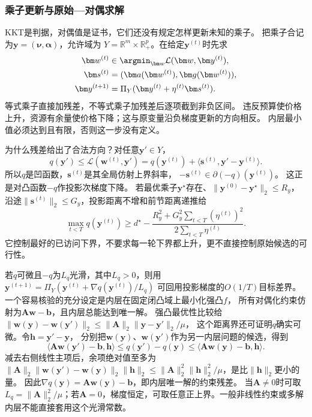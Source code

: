 \subsubsection{乘子更新与原始—对偶求解}
\label{sec:opt-multiplier-updates}

KKT是判据，对偶值是证书，它们还没有规定怎样更新未知的乘子。
把乘子合记为$\bm y=(\bm\nu,\bm\alpha)$，允许域为
$Y=\mathbb R^m\times\mathbb R_+^p$。在给定$\bm y^{(t)}$时先求
\[
 \begin{aligned}
 \bm w^{(t)}&\in\argmin_{\bm w}\mathcal L(\bm w,\bm y^{(t)}),\\
 \bm s^{(t)}&=(\bm a(\bm w^{(t)}),\bm g(\bm w^{(t)})),\\
 \bm y^{(t+1)}&=\Pi_Y(\bm y^{(t)}+\eta^{(t)}\bm s^{(t)}).
 \end{aligned}
\]
等式乘子直接加残差，不等式乘子加残差后逐项截到非负区间。
违反预算使价格上升，资源有余量使价格下降；这与原变量沿负梯度更新的方向相反。
内层最小值必须达到且有限，否则这一步没有定义。

为什么残差给出了合法方向？对任意$\bm y'\in Y$，
\[
 q(\bm y')\leq\mathcal L(\bm w^{(t)},\bm y')
 =q(\bm y^{(t)})+\langle\bm s^{(t)},\bm y'-\bm y^{(t)}\rangle.
\]
所以$q$是凹函数，$\bm s^{(t)}$是其全局仿射上界斜率，
$-\bm s^{(t)}\in\partial(-q)(\bm y^{(t)})$。
这正是对凸函数$-q$作投影次梯度下降。
若最优乘子$\bm y^\star$存在、$\|\bm y^{(0)}-\bm y^\star\|_2\leq R_y$，
沿途$\|\bm s^{(t)}\|_2\leq G_y$，投影距离不增和前节距离递推给
\[
 \max_{t<T}q(\bm y^{(t)})\geq
 d^\star-\frac{R_y^2+G_y^2\sum_{t<T}(\eta^{(t)})^2}{2\sum_{t<T}\eta^{(t)}}.
\]
它控制最好的已访问下界，不要求每一轮下界都上升，更不直接控制原始候选的可行性。

若$q$可微且$-q$为$L_q$光滑，其中$L_q>0$，则用
$\bm y^{(t+1)}=\Pi_Y(\bm y^{(t)}+\nabla q(\bm y^{(t)})/L_q)$
可回用投影梯度的$O(1/T)$目标差界。
一个容易核验的充分设定是内层在固定闭凸域上最小化强凸$f$，
所有对偶化约束仿射为$\bm A\bm w-\bm b$，且内层总能达到唯一解。
强凸最优性比较给
$\|\bm w(\bm y)-\bm w(\bm y')\|_2
\leq\|\bm A\|_2\|\bm y-\bm y'\|_2/\mu$，
这个距离界还可证明$q$确实可微。令$\bm h=\bm y'-\bm y$，
分别把$\bm w(\bm y)$、$\bm w(\bm y')$作为另一内层问题的候选，得到
\[
 \langle\bm A\bm w(\bm y')-\bm b,\bm h\rangle
 \leq q(\bm y')-q(\bm y)
 \leq\langle\bm A\bm w(\bm y)-\bm b,\bm h\rangle.
\]
减去右侧线性主项后，余项绝对值至多为
$\|\bm A\|_2\|\bm w(\bm y')-\bm w(\bm y)\|_2\|\bm h\|_2
\leq\|\bm A\|_2^2\|\bm h\|_2^2/\mu$，是比$\|\bm h\|_2$更小的量。
因此$\nabla q(\bm y)=\bm A\bm w(\bm y)-\bm b$，即内层唯一解的约束残差。
当$\bm A\neq0$时可取$L_q=\|\bm A\|_2^2/\mu$；若$\bm A=0$，梯度恒定，可取任意正上界。一般非线性约束或多解内层不能直接套用这个光滑常数。

